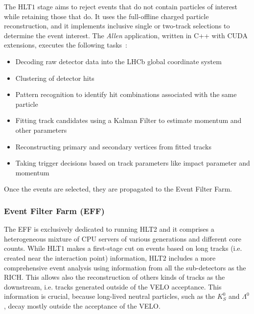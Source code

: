 The HLT$1$ stage aims to reject events that do not contain particles of interest while retaining those that do. 
It uses the full-offline charged particle reconstruction, and it implements inclusive single or two-track selections to determine the event interest. 
The \textit{Allen} application, written in C++ with CUDA extensions, executes the following tasks~\cite{CERN-LHCC-2020-006}:
\begin{itemize}
\item Decoding raw detector data into the LHCb global coordinate system
\item Clustering of detector hits
\item Pattern recognition to identify hit combinations associated with the same particle
\item Fitting track candidates using a Kalman Filter to estimate momentum and other parameters
\item Reconstructing primary and secondary vertices from fitted tracks
\item Taking trigger decisions based on track parameters like impact parameter and momentum
\end{itemize}
Once the events are selected, they are propagated to the Event Filter Farm. 


\subsubsection{Event Filter Farm (EFF)}

The EFF is exclusively dedicated to running HLT2 and it comprises a heterogeneous mixture of CPU servers of various generations and different core counts. 
While HLT$1$ makes a first-stage cut on events based on long tracks (i.e. created near the interaction point) information, HLT$2$ includes a more comprehensive event analysis using information from all the sub-detectors as the RICH. 
This allows also the reconstruction of others kinds of tracks as the downstream, i.e. tracks generated outside of the VELO acceptance. This information is crucial, because long-lived neutral particles, such as the $K^0_S$ and $\Lambda^0$, decay mostly outside the acceptance of the VELO.

